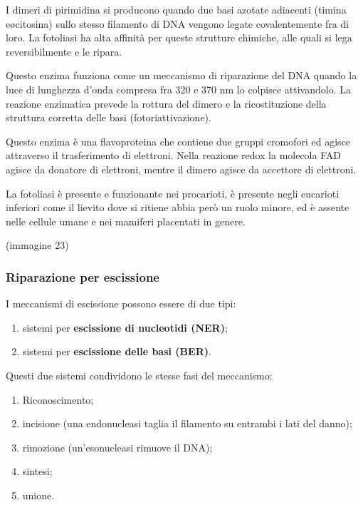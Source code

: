 \documentclass[]{article}
\begin{document}
I dimeri di pirimidina si producono quando due basi azotate adiacenti
(timina e\o citosina) sullo stesso filamento di DNA vengono legate
covalentemente fra di loro. La fotoliasi ha alta affinità per queste
strutture chimiche, alle quali si lega reversibilmente e le ripara.

Questo enzima funziona come un meccanismo di riparazione del DNA quando
la luce di lunghezza d'onda compresa fra 320 e 370 nm lo colpisce
attivandolo. La reazione enzimatica prevede la rottura del dimero e la
ricostituzione della struttura corretta delle basi (fotoriattivazione).

Questo enzima è una flavoproteina che contiene due gruppi cromofori ed
agisce attraverso il trasferimento di elettroni. Nella reazione redox la
molecola FAD agisce da donatore di elettroni, mentre il dimero agisce da
accettore di elettroni.

La fotoliasi è presente e funzionante nei procarioti, è presente negli
eucarioti inferiori come il lievito dove si ritiene abbia però un ruolo
minore, ed è assente nelle cellule umane e nei mamiferi placentati in
genere.

(immagine 23)

\subsubsection{Riparazione per
escissione}\label{riparazione-per-escissione}

I meccanismi di escissione possono essere di due tipi:

\begin{enumerate}
\def\labelenumi{\arabic{enumi}.}
\itemsep1pt\parskip0pt
\item
  sistemi per \textbf{escissione di nucleotidi (NER)};
\item
  sistemi per \textbf{escissione delle basi (BER)}.
\end{enumerate}

Questi due sistemi condividono le stesse fasi del meccanismo:

\begin{enumerate}
\def\labelenumi{\arabic{enumi}.}
\itemsep1pt\parskip0pt
\item
  Riconoscimento;
\item
  incisione (una endonucleasi taglia il filamento su entrambi i lati del
  danno);
\item
  rimozione (un'esonucleasi rimuove il DNA);
\item
  sintesi;
\item
  unione.
\end{enumerate}
\end{document}
